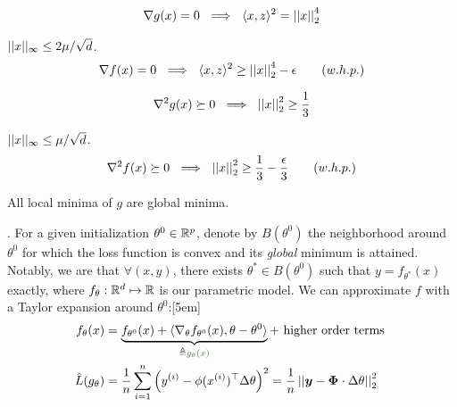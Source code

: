 \documentclass[11pt]{article}
\renewcommand\vec[2][]{\bm{#2}_{#1}}
\begin{document}
\begin{example}
\begin{definition}[-3em][Lemma 8.18]
	\begin{align}
			\nabla g(x) = 0 ~\implies~ \langle x, z \rangle^2 = \left|\left| x \right|\right|_{2}^4
\end{align}
\end{definition}

\begin{definition}[-1em][Lemma 8.19]
	 $||x||_{\infty} \leq 2\mu / \sqrt{d}$. 
	\begin{align}
		\nabla f(x) = 0 ~\implies~ \langle x, z \rangle^2 \geq \left|\left| x \right|\right|_{2}^4 - \epsilon \qquad (w.h.p.)
	\end{align}
\end{definition}

\begin{definition}[-3em][Lemma 8.20]
	\begin{align}
		\nabla^2 g(x) \succeq 0 ~\implies~ \left|\left| x \right|\right|_{2}^2 \geq \frac{1}{3}
	\end{align}
\end{definition}

\begin{definition}[-1em][Lemma 8.21]
	 $||x||_{\infty} \leq \mu / \sqrt{d}$. 
	\begin{align}
		\nabla^2 f(x) \succeq 0 ~\implies~ \left|\left| x \right|\right|_{2}^2 \geq \frac{1}{3} - \frac{\epsilon}{3} \qquad (w.h.p.)
	\end{align}
\end{definition}

\begin{definition}[-1em][Lemma 8.22]
	All local minima of $g$ are global minima. 
\end{definition}



	
\end{example}







. For a given initialization $\theta^0 \in \mathbb{R}^p$, denote by $B(\theta^0)$ the neighborhood around $\theta^0$ for which the loss function is convex and its \textit{global} minimum is attained. Notably, we are  that $\forall (x, y)$, there exists $\theta^* \in B(\theta^0)$ such that $y = f_{\theta^*}(x)$ exactly, where $f_{\theta}: \mathbb{R}^d \mapsto \mathbb{R}$ is our parametric model. We can approximate $f$ with a Taylor expansion around $\theta^0$:[5em]
\begin{align}
	f_{\theta}(x)
		&= \underbrace{f_{\theta^0}(x)  + \langle \nabla_{\theta} f_{\theta^0}(x), \theta - \theta^0 \rangle  }_{\triangleq \mgreen{ g_{\theta}(x)}} + \text{ higher order terms } \\
	\hat L(g_{\theta})
		&= \inv{n} \insum \lr{ y^{(i)} - \phi(\ival[i]{x})^\top \Delta \theta }^2 = \inv{n} \norm{\vec y - \matr\Phi \cdot \Delta\theta}^2
\end{align}
\end{document}
